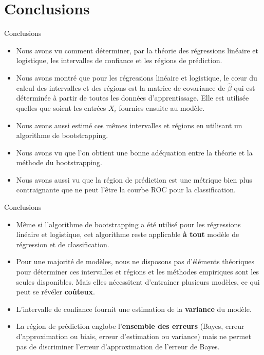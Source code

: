 \section[Conclusions]{Conclusions}

\begin{frame}{Conclusions}
	\begin{itemize}
		\item Nous avons vu comment déterminer, par la théorie des régressions linéaire et logistique, les intervalles de confiance et les régions de prédiction.
		\pause
		\item Nous avons montré que pour les régressions linéaire et logistique, le cœur du calcul des intervalles et des régions est la matrice de covariance de $\hat{\beta}$ qui est déterminée à partir de toutes les données d'apprentissage. Elle est utilisée quelles que soient les entrées $X_i$ fournies ensuite au modèle.
		\pause
		\item Nous avons aussi estimé ces mêmes intervalles et régions en utilisant un algorithme de bootstrapping.
		\pause
		\item Nous avons vu que l'on obtient une bonne adéquation entre la théorie et la méthode du bootstrapping.
		\pause
		\item Nous avons aussi vu que la région de prédiction est une métrique bien plus contraignante que ne peut l'être la courbe ROC pour la classification.
	\end{itemize}
\end{frame}

\begin{frame}{Conclusions}
	\begin{itemize}
		\item Même si l'algorithme de bootstrapping a été utilisé pour les régressions linéaire et logistique, cet algorithme reste applicable \textbf{à tout} modèle de régression et de classification.
		\pause
		\item Pour une majorité de modèles, nous ne disposons pas d'éléments théoriques pour déterminer ces intervalles et régions et les méthodes empiriques sont les seules disponibles. Mais elles nécessitent d'entrainer plusieurs modèles, ce qui peut se révéler \textbf{coûteux}.
		\pause
		\item L'intervalle de confiance fournit une estimation de la \textbf{variance} du modèle.
		\pause
		\item La région de prédiction englobe l'\textbf{ensemble des erreurs} (Bayes, erreur d'approximation ou biais, erreur d'estimation ou variance) mais ne permet pas de discriminer l'erreur d'approximation de l'erreur de Bayes.
	\end{itemize}
\end{frame}

